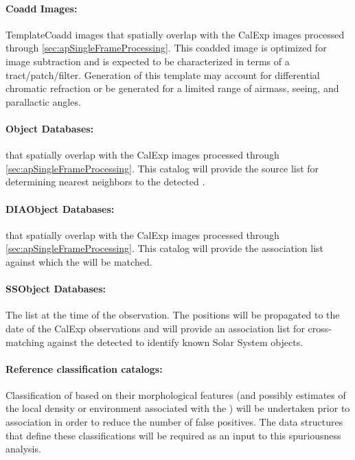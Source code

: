 \paragraph*{Coadd Images:} TemplateCoadd images that spatially overlap with the CalExp images processed through \ref{sec:apSingleFrameProcessing}. This coadded image is optimized for image subtraction and is expected to be characterized in terms of a tract/patch/filter. Generation of this template may account for differential chromatic refraction or be generated for a limited range of airmass, seeing, and parallactic angles.

\paragraph*{Object Databases:} \Objects that spatially overlap with the CalExp images processed through \ref{sec:apSingleFrameProcessing}. This \Object catalog will provide the source list for determining nearest neighbors to the detected \DIASources.


\paragraph*{DIAObject Databases:} \DIAObjects that spatially overlap with the CalExp images processed through \ref{sec:apSingleFrameProcessing}. This \DIAObject catalog will provide the association  list against which the \DIASources will be matched.

\paragraph*{SSObject Databases:} The \SSObject list at the time of the observation. The \SSObject positions will be propagated to the date of the CalExp observations and will provide an association  list for cross-matching against the detected \DIASources to identify known Solar System objects.

\paragraph*{Reference classification catalogs:} Classification of \DIASources based on their morphological features (and possibly estimates of the local density or  environment associated with the \DIASource) will be undertaken prior to association in order to reduce the number of false positives. The data structures that define these classifications will be required as an input to this spuriousness analysis.



